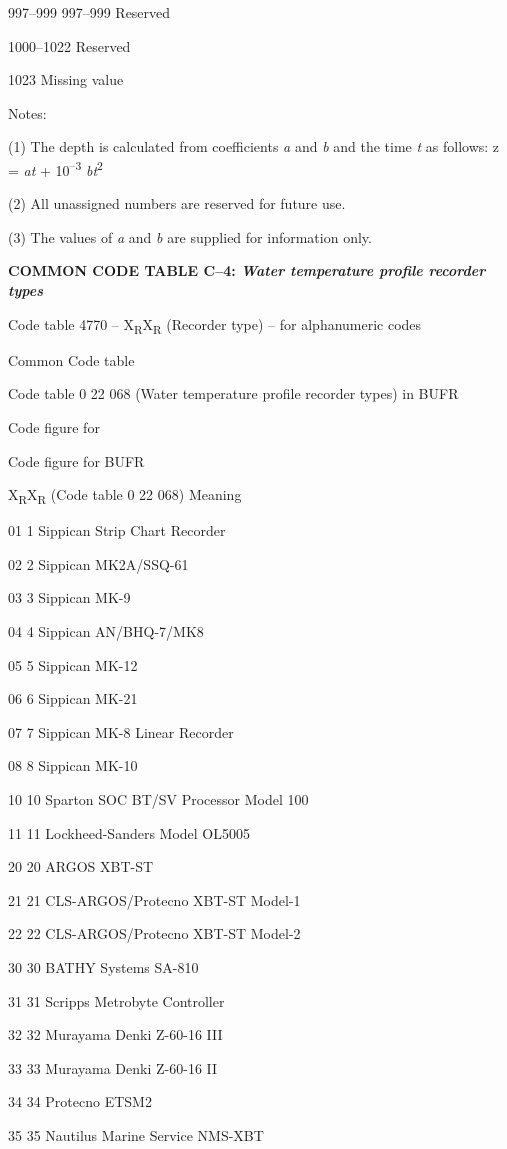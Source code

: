 997--999 997--999 Reserved

1000--1022 Reserved

1023 Missing value

Notes:

(1) The depth is calculated from coefficients \emph{a} and \emph{b} and the time \emph{t} as follows: z = \emph{at} + 10\textsuperscript{--3} \emph{bt}\textsuperscript{2}

(2) All unassigned numbers are reserved for future use.

(3) The values of \emph{a} and \emph{b} are supplied for information only.

\textbf{COMMON CODE TABLE C--4: \emph{Water temperature profile recorder types}}

Code table 4770 -- X\textsubscript{R}X\textsubscript{R} (Recorder type) -- for alphanumeric codes

Common Code table

Code table 0 22 068 (Water temperature profile recorder types) in BUFR

Code figure for

Code figure for BUFR

X\textsubscript{R}X\textsubscript{R} (Code table 0 22 068) Meaning

01 1 Sippican Strip Chart Recorder

02 2 Sippican MK2A/SSQ-61

03 3 Sippican MK-9

04 4 Sippican AN/BHQ-7/MK8

05 5 Sippican MK-12

06 6 Sippican MK-21

07 7 Sippican MK-8 Linear Recorder

08 8 Sippican MK-10

10 10 Sparton SOC BT/SV Processor Model 100

11 11 Lockheed-Sanders Model OL5005

20 20 ARGOS XBT-ST

21 21 CLS-ARGOS/Protecno XBT-ST Model-1

22 22 CLS-ARGOS/Protecno XBT-ST Model-2

30 30 BATHY Systems SA-810

31 31 Scripps Metrobyte Controller

32 32 Murayama Denki Z-60-16 III

33 33 Murayama Denki Z-60-16 II

34 34 Protecno ETSM2

35 35 Nautilus Marine Service NMS-XBT

